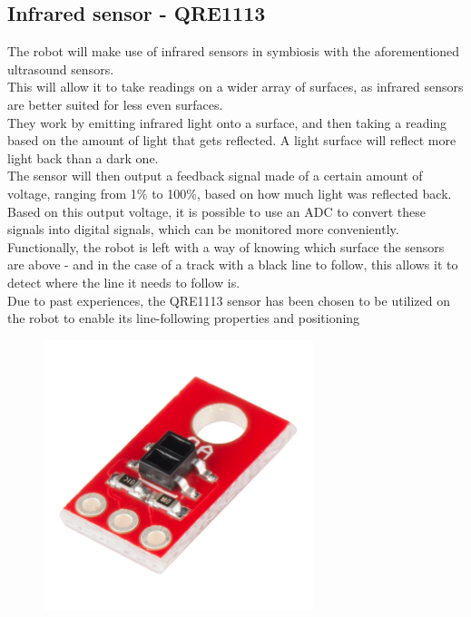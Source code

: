 \subsection{Infrared sensor - QRE1113}

The robot will make use of infrared sensors in symbiosis with the aforementioned ultrasound sensors.\\ This will allow it to take readings on a wider array of surfaces, as infrared sensors are better suited for less even surfaces.\\ They work by emitting infrared light onto a surface, and then taking a reading based on the amount of light that gets reflected. A light surface will reflect more light back than a dark one.\\ The sensor will then output a feedback signal made of a certain amount of voltage, ranging from 1\% to 100\%, based on how much light was reflected back. Based on this output voltage, it is possible to use an ADC to convert these signals into digital signals, which can be monitored more conveniently.\\ Functionally, the robot is left with a way of knowing which surface the sensors are above - and in the case of a track with a black line to follow, this allows it to detect where the line it needs to follow is.\\

Due to past experiences, the QRE1113 sensor has been chosen to be utilized on the robot to enable its line-following properties and positioning

\begin{figure}[!ht]
	\centering
	\includegraphics[width=0.7\textwidth]{figures/QRE.jpg}
	\caption{}
	\label{Hardware diagram}
\end{figure}

